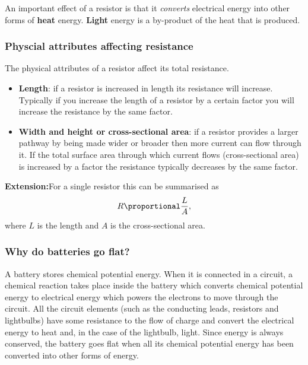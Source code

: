 An important effect of a resistor is that it \textit{converts} electrical
energy into other forms of \textbf{heat} energy. \textbf{Light} energy is a by-product of the heat that is produced.


\subsubsection{Physcial attributes affecting resistance}

The physical attributes of a resistor affect its total resistance.
\begin{itemize}
 \item \textbf{Length}: if a resistor is increased in length its resistance will increase. Typically if you increase the length of a resistor by a certain factor you will increase the resistance by the same factor.
\item \textbf{Width and height or cross-sectional area}: if a resistor provides a larger pathway by being made wider or broader then more current can flow through it. If the total surface area through which current flows (cross-sectional area) is increased by a factor the resistance typically decreases by the same factor. 
\end{itemize}
\textbf{Extension:}For a single resistor this can be summarised as
\begin{equation*}
 R\proportional\frac{L}{A},
\end{equation*} where $L$ is the length and $A$ is the cross-sectional area.

\subsubsection*{Why do batteries go flat?}
A battery stores chemical potential energy. When it is connected in a circuit, a chemical reaction takes place inside the battery which converts chemical potential energy to electrical energy which powers the electrons to move through the circuit. All the circuit elements (such as the conducting leads, resistors and lightbulbs) have some resistance to the flow of charge and convert the electrical energy to heat and, in the case of the lightbulb, light.
Since energy is always conserved, the battery goes flat when all its chemical potential energy has been converted into other forms of energy.

